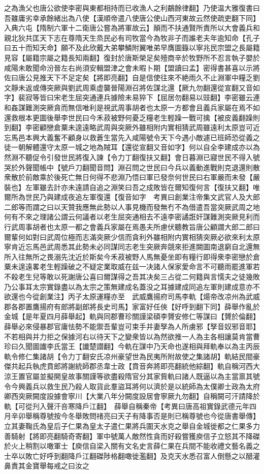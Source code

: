之為漁父也唐公欲使李密與東都相持而已收漁人之利鷸餘律翻】乃使温大雅復書曰吾雖庸劣幸承餘緒出為八使【漢順帝遣八使唐公使山西河東故云然使疏吏翻下同】入典六屯【隋制六軍十二衛唐公嘗為將軍故云】顛而不扶通賢所責所以大會義兵和親北狄共匡天下志在尊隋天生烝民必有司牧當今為牧非子而誰老夫年逾知命【孔子曰五十而知天命】願不及此欣戴大弟攀鱗附翼唯弟早膺圖籙以寧兆民宗盟之長屬籍見容【屬籍宗屬之籍長知兩翻】復封於唐斯榮足矣殪商辛於牧野所不忍言執子嬰於咸陽未敢聞命汾晉左右尚須安輯盟津之會未暇卜期【盟讀曰孟】密得書甚喜以示將佐曰唐公見推天下不足定矣【將即亮翻】自是信使往來不絶雨久不止淵軍中糧乏劉文靜未返或傳突厥與劉武周乘虚襲晉陽淵召將佐謀北還【厥九勿翻還從宣翻又音如字】裴寂等皆曰宋老生屈突通連兵據險未易猝下【屈居勿翻易以豉翻】李密雖云連和姦謀難測突厥貪而無信唯利是視武周事胡者也太原一方都會且義兵家屬在焉不如還救根本更圖後舉李世民曰今禾菽被野何憂乏糧老生輕躁一戰可擒【被皮義翻躁則到翻】李密顧戀倉粟未遑遠略武周與突厥外雖相附内實相猜武周雖遠利太原豈可近忘馬邑本興大義奮不顧身以救蒼生當先入咸陽號令天下今遇小敵遽已班師恐從義之徒一朝解體還守太原一城之地為賊耳【還從宣翻又音如字】何以自全李建成亦以為然淵不聽促令引發世民將復入諫【令力丁翻復扶又翻】會日暮淵已寢世民不得入號哭於外聲聞帳中【號戶刀翻聞音問】淵召問之世民曰今兵以義動進戰則克退還則散衆散於前敵乘於後死亡無日何得不悲淵乃悟曰軍已發奈何世民曰右軍嚴而未發【嚴裝也】左軍雖去計亦未遠請自追之淵笑曰吾之成敗皆在爾知復何言【復扶又翻】唯爾所為世民乃與建成夜追左軍復還【復音如字　考異曰創業注帝集文武官人及大郎二郎等而謂之曰以天贊我應無此勢以人事見機而發無冇不為借遣吾當突厥武周之地何有不來之理諸公謂云何議者以老生屈突通相去不遠李密譎誑奸謀難測突厥見利而行武周事胡者也太原一都之會義兵家屬在焉愚夫所慮伏聽教旨唐公顧謂大郎二郎曰爾輩何如對曰武周位極而志滿突厥少信而貪利外雖相附内實相猜突厥必欲來利太原寧肯近忘馬邑武周悉其此勢未必同謀同志老生突厥奔競來拒進闕圖南退窮自北還無所入往無所之畏溺先沈近於斯矣今禾菽被野人馬無憂坐即有糧行即得衆李密戀於倉粟未遑遠畧老生輕躁破之不疑定業取威在兹一决諸人保家愛命言不可聽雨罷進軍若不殺老生兒等敢以死謝唐公喜曰爾謀得之吾其决矣三占從二何籍與言懦夫之徒幾敗乃公事耳太宗實錄盡以為太宗之策無建成名蓋没之耳據建成同追左軍則建成意亦不欲還也今從創業注】丙子太原運糧亦至　武威鷹揚府司馬李軌【煬帝改凉州為武威郡各郡置鷹揚府有郎將副郎將長史司馬】家富好任俠【好呼到翻下同】薛舉作亂於金城【是年夏四月薛舉起】軌與同郡曹珍關謹梁碩李贇安修仁等謀曰【贇於倫翻】薛舉必來侵暴郡官庸怯勢不能禦吾輩豈可束手并妻孥為人所虜邪【孥音奴邪音耶】不若相與并力拒之保據河右以待天下之變衆皆以為然欲推一人為主各相讓莫肯當曹珍曰久聞圖䜟李氏當王【䜟楚譛翻】今軌在謀中乃天命也遂相與拜軌奉以為主丙辰軌令修仁集諸胡【令力丁翻安氏凉州豪望世為民夷所附故使之集諸胡】軌結民間豪傑共起兵執虎賁郎將謝統師郡丞韋士政【賁音奔將即亮翻統他綜翻】軌自稱河西大涼王置官屬並擬開皇故事關謹等欲盡殺隋官分其家貲軌曰諸人既逼以為主當禀其號令今興義兵以救生民乃殺人取貨此羣盜耳將何以濟於是以統師為太僕卿士政為太府卿西突厥闕度設據會寧川【大業八年分闕度設居會寧厥九勿翻】自稱闕可汗請降於軌【可從刋入聲汗咅寒降戶江翻】　薛舉自稱秦帝【考異曰唐高祖實錄武德元年四月辛卯舉稱尊號按今冬舉敗問禇亮曰天子有降事否是則已稱尊號也今從唐書舉傳】立其妻鞠氏為皇后子仁果為皇太子遣仁果將兵圍天水克之舉自金城徙都之仁果多力善騎射【將即亮翻騎奇寄翻】軍中號萬人敵然性貪而好殺嘗獲庾信子立怒其不降磔於火上稍割以噉軍士【庾信自梁入關有文名史言薛仁果在兵間不能收禮文藝名義之士卒以敗亡好呼到翻降戶江翻磔陟格翻噉徙濫翻】及克天水悉召富人倒懸之以醋灌鼻責其金寶舉每戒之曰汝之